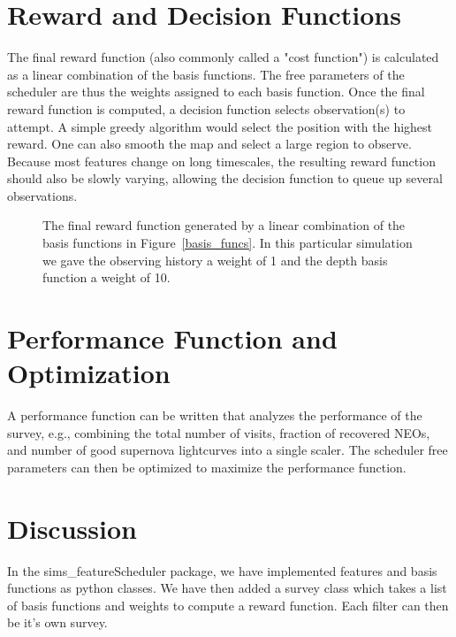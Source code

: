 \documentclass[12pt,preprint]{aastex}
\begin{document}
\section{Reward and Decision Functions}

The final reward function (also commonly called a "cost function") is calculated as a linear combination of the basis functions. The free parameters of the scheduler are thus the weights assigned to each basis function. Once the final reward function is computed, a decision function selects observation(s) to attempt. A simple greedy algorithm would select the position with the highest reward. One can also smooth the map and select a large region to observe. Because most features change on long timescales, the resulting reward function should also be slowly varying, allowing the decision function to queue up several observations.


\begin{figure}
\caption{The final reward function generated by a linear combination of the basis functions in Figure~\ref{basis_funcs}. In this particular simulation we gave the observing history a weight of 1 and the depth basis function a weight of 10.\label{goal}}
\end{figure}



\section{Performance Function and Optimization}

A performance function can be written that analyzes the performance of the survey, e.g., combining the total number of visits, fraction of recovered NEOs, and number of good supernova lightcurves into a single scaler. The scheduler free parameters can then be optimized to maximize the performance function. 

\section{Discussion}
In the sims\_featureScheduler package, we have implemented features and basis functions as python classes. We have then added a survey class which takes a list of basis functions and weights to compute a reward function. Each filter can then be it's own survey.
\end{document}
